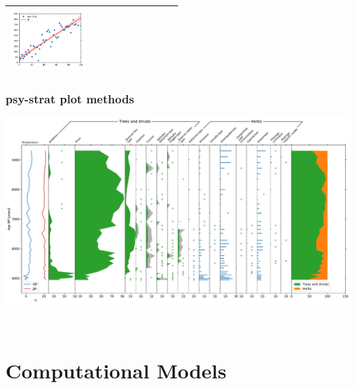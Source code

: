 \documentclass[
11pt, %
english, %
singlespacing, %
headsepline, %
]{MastersDoctoralThesis} %
\begin{document}
\begin{NoHyper}
\begin{refsection}
\begin{subappendices}
\begin{tabular}{l|p{0.25\linewidth}|p{0.25\linewidth}|}
				\includegraphics[width=\linewidth, page=4]{psyplot-figures/psy-reg-demo.pdf} \\
			\bottomrule
		\end{tabular}

	\section{psy-strat plot methods}  \label{sec:psy-strat-plotmethods}

		\includegraphics[width=\linewidth]{psyplot-figures/psy-strat-demo.pdf}

\end{subappendices}\

\printbibliography[heading=subbibintoc]

\end{refsection}

\part{Computational Models}  \label{part:models}


\end{NoHyper}
\end{document}

